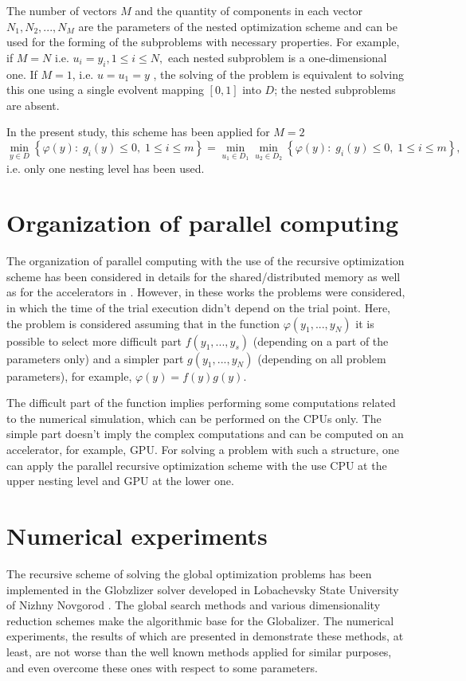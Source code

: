 \documentclass[a4paper]{jpconf}
\begin{document}
The number of vectors $M$ and the quantity of components in each vector $N_1, N_2,...,N_M$ are the parameters of the nested optimization scheme and can be used for the forming of the subproblems with necessary properties. For example, if  $M=N$ i.e. $u_i=y_i, 1\leq i \leq N,$ each nested subproblem is a one-dimensional one. If $M=1$, i.e. $u=u_1=y$ , the solving of the problem is equivalent to solving this one using a single evolvent mapping $[0,1]$ into $D$; the nested subproblems are absent. 

In the present study, this scheme has been applied for $M=2$
\[
\min_{y \in D}{\left\{\varphi(y): \; g_i(y)\leq 0, \; 1 \leq i \leq 
m\right\}}= \min_{u_1\in D_1}\min_{u_2\in D_2}{\left\{\varphi(y): \; 
g_i(y)\leq 0, \; 1 \leq i \leq m\right\}},
\]
i.e. only one nesting level has been used.

\section{Organization of parallel computing}\label{sec:4}

The organization of parallel computing with the use of the recursive 
optimization scheme has been considered in details for the shared/distributed 
memory as well as for the accelerators in \cite{Sysoyev,BarkalovLebedev}. However, in these works the 
problems were considered, in which the time of the trial execution didn't 
depend on the trial point. Here, the problem is considered assuming that in 
the function $\varphi(y_1,...,y_N)$ it is possible to select more difficult 
part $f(y_1,...,y_s)$ (depending on a part of the parameters only) and a simpler 
part $g(y_1,...,y_N)$ (depending on all problem parameters), for 
example, $\varphi(y)= f(y)g(y)$.

The difficult part of the function implies performing some  
computations related to the numerical simulation, which can be performed on the 
CPUs only. The simple part doesn't imply the complex computations and can be 
computed on an accelerator, for example, GPU. For solving a problem with such 
a structure, one can apply the parallel recursive optimization scheme with 
the use CPU at the upper nesting level and GPU at the lower one.

\section{Numerical experiments}\label{sec:5}

The recursive scheme of solving the global optimization problems has been 
implemented in the Globzlizer solver developed in Lobachevsky State 
University of Nizhny Novgorod \cite{Globalizer,Globalizer1}. The global search methods and various 
dimensionality reduction schemes make the algorithmic base for the 
Globalizer. The numerical experiments, the results of which are presented in 
\cite{BarkalovGergelLebedev,BarkalovGergel} demonstrate these methods, at least, are not worse than the well known 
methods applied for similar purposes, and even overcome these ones with 
respect to some parameters. 
\end{document}
